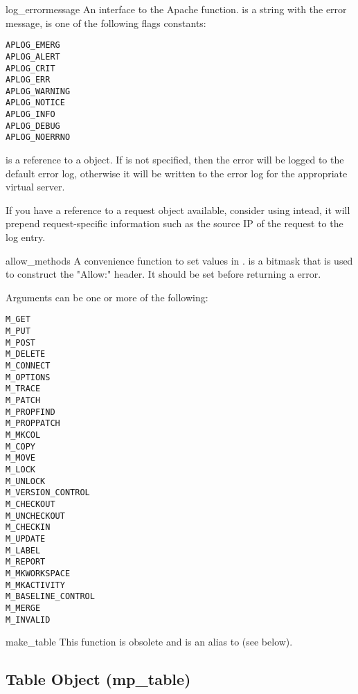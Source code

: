 \begin{funcdesc}{log_error}{message}
An interface to the Apache
function.  is a string with the error message,  is
one of the following flags constants:

\begin{verbatim}
APLOG_EMERG
APLOG_ALERT
APLOG_CRIT
APLOG_ERR
APLOG_WARNING
APLOG_NOTICE
APLOG_INFO
APLOG_DEBUG
APLOG_NOERRNO
\end{verbatim}            
      
 is a reference to a  object. If
 is not specified, then the error will be logged to the
default error log, otherwise it will be written to the error log for
the appropriate virtual server.

If you have a reference to a request object available, consider using
 intead, it will prepend request-specific
information such as the source IP of the request to the log entry.
\end{funcdesc}

\begin{funcdesc}{allow_methods}{}
A convenience function to set values in .
 is a bitmask that is used to construct the
"Allow:" header. It should be set before returning a
 error.

Arguments can be one or more of the following:
\begin{verbatim}
M_GET
M_PUT
M_POST
M_DELETE
M_CONNECT
M_OPTIONS
M_TRACE
M_PATCH
M_PROPFIND
M_PROPPATCH
M_MKCOL
M_COPY
M_MOVE
M_LOCK
M_UNLOCK
M_VERSION_CONTROL
M_CHECKOUT
M_UNCHECKOUT
M_CHECKIN
M_UPDATE
M_LABEL
M_REPORT
M_MKWORKSPACE
M_MKACTIVITY
M_BASELINE_CONTROL
M_MERGE
M_INVALID
\end{verbatim}

\end{funcdesc}

\begin{funcdesc}{make_table}{} 
This function is obsolete and is an alias to  (see below).
\end{funcdesc}

\subsection{Table Object (mp_table)\label{pyapi-mptable}}

